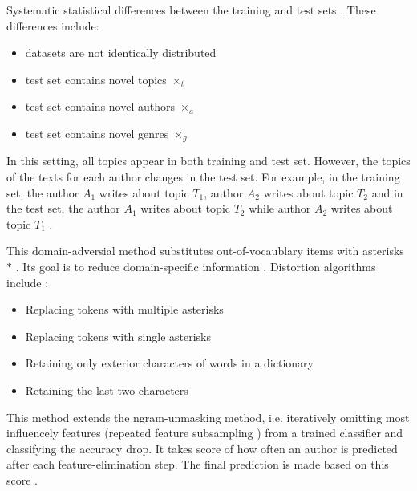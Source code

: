 \begin{definition}
    Systematic statistical differences between the training and test sets \cite{tyo_state_2022}.
    These differences include:
    \begin{itemize}
        \item datasets are not identically distributed
        \item test set contains novel topics $\times_t$
        \item test set contains novel authors $\times_a$
        \item test set contains novel genres $\times_g$
    \end{itemize}
\end{definition}

\begin{definition}
    In this setting, all topics appear in both training and test set. 
    However, the topics of the texts for each author changes in the test set.
    For example, in the training set, the author $A_1$ writes about topic $T_1$, author $A_2$ writes about topic $T_2$ 
    and in the test set, 
    the author $A_1$ writes about topic $T_2$ while author $A_2$ writes about topic $T_1$ \cite{tyo_state_2022}.
\end{definition}

\begin{definition}
    This domain-adversial method substitutes out-of-vocaublary items with asterisks $*$ \cite{tyo_state_2022}.
    Its goal is to reduce domain-specific information \cite{bischoff_importance_2020}.
    Distortion algorithms include \cite{bischoff_importance_2020}:
    \begin{itemize}
        \item Replacing tokens with multiple asterisks
        \item Replacing tokens with single asterisks
        \item Retaining only exterior characters of words in a dictionary
        \item Retaining the last two characters
    \end{itemize}
\end{definition}

\begin{definition}
    This method extends the ngram-unmasking method, i.e. iteratively omitting most influencely features (repeated feature subsampling \cite{koppel_determining_2014})
    from a trained classifier and classifying the accuracy drop.
    It takes score of how often an author is predicted after each feature-elimination step.
    The final prediction is made based on this score \cite{tyo_state_2022}.
\end{definition}


